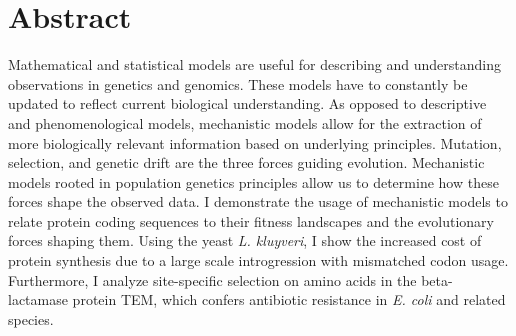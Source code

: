 \chapter*{Abstract}\label{ch:abstract}

Mathematical and statistical models are useful for describing and understanding observations in genetics and genomics.
These models have to constantly be updated to reflect current biological understanding.
As opposed to descriptive and phenomenological models, mechanistic models allow for the extraction of more biologically relevant information based on underlying principles.
Mutation, selection, and genetic drift are the three forces guiding evolution.
Mechanistic models rooted in population genetics principles allow us to determine how these forces shape the observed data.
I demonstrate the usage of mechanistic models to relate protein coding sequences to their fitness landscapes and the evolutionary forces shaping them.
Using the yeast \textit{L. kluyveri}, I show the increased cost of protein synthesis due to a large scale introgression with mismatched codon usage.
Furthermore, I analyze site-specific selection on amino acids in the beta-lactamase protein TEM, which confers antibiotic resistance in \textit{E. coli} and related species. 


